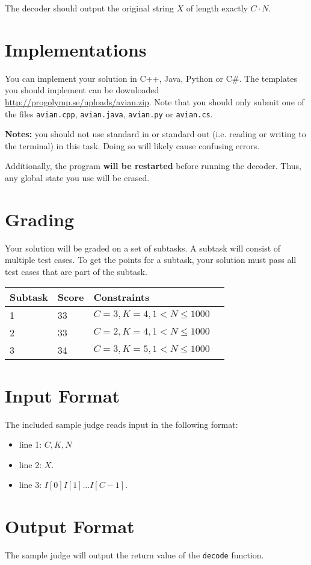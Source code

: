 The decoder should output the original string $X$ of length exactly $C \cdot N$.

\section*{Implementations}
You can implement your solution in C++, Java, Python or C\#.
The templates you should implement can be downloaded \href{here}{http://progolymp.se/uploads/avian.zip}.
Note that you should only submit one of the files \texttt{avian.cpp}, \texttt{avian.java}, \texttt{avian.py} or \texttt{avian.cs}.

\textbf{Notes:} you should not use standard in or standard out (i.e. reading or writing to the terminal) in this task.
Doing so will likely cause confusing errors.

Additionally, the program \textbf{will be restarted} before running the decoder.
Thus, any global state you use will be erased.

\section*{Grading}
Your solution will be graded on a set of subtasks.
A subtask will consist of multiple test cases.
To get the points for a subtask, your solution must pass all test cases that are part of the subtask.

\noindent
\begin{tabular}{| l | l | l | l |}
\hline
Subtask & Score & Constraints \\ \hline
1       & 33    & $C = 3, K = 4, 1 < N \le 1000$ \\ \hline
2       & 33    & $C = 2, K = 4, 1 < N \le 1000$ \\ \hline
3       & 34    & $C = 3, K = 5, 1 < N \le 1000$ \\ \hline
\end{tabular}

\section{Input Format}
The included sample judge reads input in the following format:
\begin{itemize}
	\item line 1: $C, K, N$
	\item line 2: $X$.
	\item line 3: $I[0] I[1] ... I[C - 1]$.
\end{itemize}

\section{Output Format}
The sample judge will output the return value of the \texttt{decode} function.
